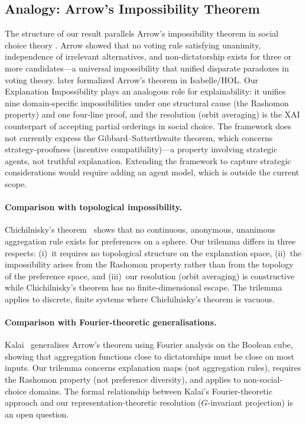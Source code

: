 \documentclass[11pt,a4paper]{article}
\begin{document}
\subsection{Analogy: Arrow's Impossibility Theorem}
\label{sec:arrow-analogy}

The structure of our result parallels Arrow's impossibility theorem in social
choice theory \citep{arrow1951social}.  Arrow showed that no voting rule
satisfying unanimity, independence of irrelevant alternatives, and
non-dictatorship exists for three or more candidates---a universal
impossibility that unified disparate paradoxes in voting theory.
\citet{nipkow2009social} later formalized Arrow's theorem in Isabelle/HOL.
Our Explanation Impossibility plays an analogous role for
explainability: it unifies nine domain-specific impossibilities under one
structural cause (the Rashomon property) and one four-line proof, and the
resolution (orbit averaging) is the XAI counterpart of accepting partial
orderings in social choice.
The framework does not currently express the Gibbard--Satterthwaite theorem, which concerns strategy-proofness (incentive compatibility)---a property involving strategic agents, not truthful explanation.  Extending the framework to capture strategic considerations would require adding an agent model, which is outside the current scope.

\paragraph{Comparison with topological impossibility.}
Chichilnisky's theorem~\cite{chichilnisky1980social} shows that no continuous, anonymous, unanimous aggregation rule exists for preferences on a sphere. Our trilemma differs in three respects: (i)~it requires no topological structure on the explanation space, (ii)~the impossibility arises from the Rashomon property rather than from the topology of the preference space, and (iii)~our resolution (orbit averaging) is constructive while Chichilnisky's theorem has no finite-dimensional escape. The trilemma applies to discrete, finite systems where Chichilnisky's theorem is vacuous.

\paragraph{Comparison with Fourier-theoretic generalisations.}
Kalai~\cite{kalai2002fourier} generalises Arrow's theorem using Fourier analysis on the Boolean cube, showing that aggregation functions close to dictatorships must be close on most inputs. Our trilemma concerns explanation maps (not aggregation rules), requires the Rashomon property (not preference diversity), and applies to non-social-choice domains. The formal relationship between Kalai's Fourier-theoretic approach and our representation-theoretic resolution ($G$-invariant projection) is an open question.
\end{document}
